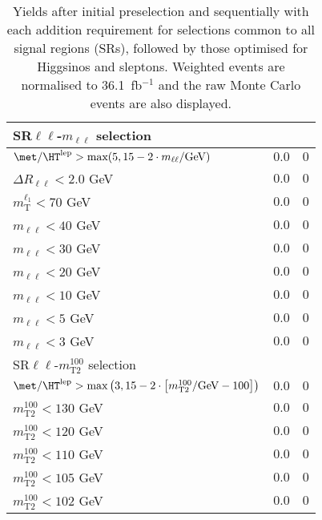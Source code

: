 \begin{table}
\begin{center}
\begin{tabular*}{\textwidth}{@{\extracolsep{\fill}}lrr}
\midrule
SR$\ell\ell$-$m_{\ell\ell}$ selection & \\ 
\midrule
$\met / \HT^\text{lep} > \text{max}(5, 15-2\cdot m_{\ell\ell}/\text{GeV})$ & $0.0$ & $0$   \\ 
    $\Delta R_{\ell\ell} < 2.0$ GeV & $0.0$ & $0$   \\ 
    $m_\text{T}^{\ell_1} < 70$ GeV & $0.0$ & $0$   \\ 
    $m_{\ell\ell} < 40$ GeV & $0.0$ & $0$   \\ 
    $m_{\ell\ell} < 30$ GeV & $0.0$ & $0$   \\ 
    $m_{\ell\ell} < 20$ GeV & $0.0$ & $0$   \\ 
    $m_{\ell\ell} < 10$ GeV & $0.0$ & $0$   \\ 
    $m_{\ell\ell} < 5$ GeV & $0.0$ & $0$   \\ 
    $m_{\ell\ell} < 3$ GeV & $0.0$ & $0$   \\ 
    \midrule
SR$\ell\ell$-$m_\text{T2}^{100}$ selection & \\ 
\midrule
$\met / \HT^\text{lep} > \text{max}\left(3, 15-2\cdot \left[m_\text{T2}^{100}/\text{GeV} - 100\right]\right)$ & $0.0$ & $0$   \\ 
    $m_\text{T2}^{100} < 130$ GeV & $0.0$ & $0$   \\ 
    $m_\text{T2}^{100} < 120$ GeV & $0.0$ & $0$   \\ 
    $m_\text{T2}^{100} < 110$ GeV & $0.0$ & $0$   \\ 
    $m_\text{T2}^{100} < 105$ GeV & $0.0$ & $0$   \\ 
    $m_\text{T2}^{100} < 102$ GeV & $0.0$ & $0$   \\ 
    
  \bottomrule
  \end{tabular*}
\end{center}
\caption{ Yields after initial preselection and sequentially with each addition requirement 
for selections common to all signal regions (SRs), 
followed by those optimised for Higgsinos and sleptons. 
Weighted events are normalised to 36.1~fb$^{-1}$ and the raw Monte Carlo events are also displayed.
}
\label{tab:cutflow_fakes}
\end{table} 
  